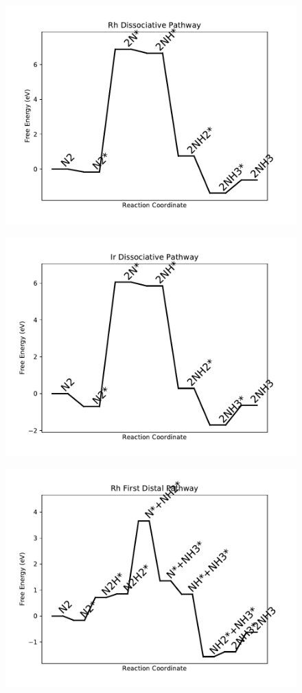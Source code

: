 \begin{figure}
\includegraphics[width=0.8\linewidth]{data/plots/Rh_dissociative.pdf}
\end{figure}

\begin{figure}
\includegraphics[width=0.8\linewidth]{data/plots/Ir_dissociative.pdf}
\end{figure}

\begin{figure}
\includegraphics[width=0.8\linewidth]{data/plots/Rh_distal_1.pdf}
\end{figure}

